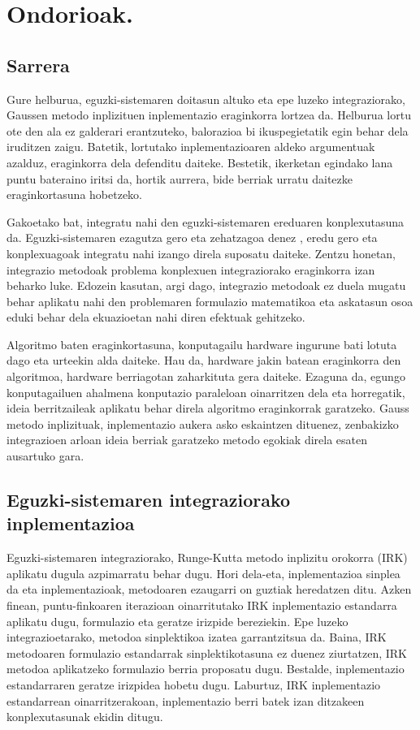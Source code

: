 \chapter{Ondorioak.}


\section*{Sarrera}

Gure helburua, eguzki-sistemaren doitasun altuko eta epe luzeko integraziorako, Gaussen metodo inplizituen inplementazio eraginkorra lortzea da. Helburua lortu ote den ala ez galderari erantzuteko, balorazioa bi ikuspegietatik egin behar dela iruditzen zaigu. Batetik, lortutako inplementazioaren aldeko argumentuak azalduz, eraginkorra dela defenditu daiteke. Bestetik, ikerketan egindako lana puntu bateraino iritsi da, hortik aurrera, bide berriak urratu daitezke eraginkortasuna hobetzeko.

Gakoetako bat, integratu nahi den eguzki-sistemaren ereduaren konplexutasuna da. Eguzki-sistemaren ezagutza gero eta zehatzagoa denez \cite{Kaplan2015}, eredu gero eta konplexuagoak integratu nahi izango direla suposatu daiteke. Zentzu honetan, integrazio metodoak problema konplexuen integraziorako eraginkorra izan beharko luke. Edozein kasutan, argi dago, integrazio metodoak  ez duela mugatu behar aplikatu nahi den problemaren formulazio matematikoa  eta askatasun osoa eduki behar dela ekuazioetan nahi diren efektuak gehitzeko.   

Algoritmo baten eraginkortasuna, konputagailu hardware ingurune bati lotuta dago eta urteekin alda daiteke. Hau da,   hardware jakin batean eraginkorra den algoritmoa, hardware berriagotan zaharkituta gera daiteke.  Ezaguna da, egungo konputagailuen ahalmena konputazio paraleloan oinarritzen dela eta horregatik, ideia berritzaileak aplikatu behar direla algoritmo eraginkorrak garatzeko. Gauss metodo inplizituak, inplementazio aukera asko eskaintzen dituenez, zenbakizko integrazioen arloan ideia berriak garatzeko metodo egokiak direla \cite{Dongarra2017} esaten ausartuko gara.   


\section*{Eguzki-sistemaren integraziorako inplementazioa}


Eguzki-sistemaren integraziorako, Runge-Kutta metodo inplizitu orokorra (IRK) aplikatu dugula azpimarratu behar dugu. Hori dela-eta, inplementazioa sinplea da eta inplementazioak, metodoaren ezaugarri on guztiak heredatzen ditu. Azken finean, puntu-finkoaren iterazioan oinarritutako IRK inplementazio estandarra aplikatu dugu, formulazio eta geratze irizpide bereziekin. Epe luzeko integrazioetarako, metodoa sinplektikoa izatea garrantzitsua da. Baina, IRK metodoaren formulazio estandarrak  sinplektikotasuna ez duenez ziurtatzen, IRK metodoa aplikatzeko formulazio berria proposatu dugu. Bestalde, inplementazio estandarraren geratze irizpidea hobetu dugu. Laburtuz, IRK inplementazio estandarrean oinarritzerakoan, inplementazio berri batek izan ditzakeen konplexutasunak ekidin ditugu. 

